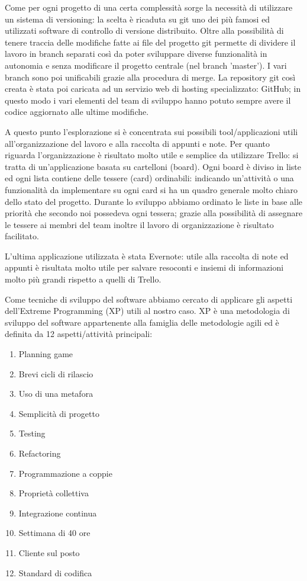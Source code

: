 \documentclass[12pt]{report}
\begin{document}
Come per ogni progetto di una certa complessità sorge la necessità di utilizzare un sistema di versioning: la scelta è ricaduta su git uno dei più famosi ed utilizzati software di controllo di versione distribuito. Oltre alla possibilità di tenere traccia delle modifiche fatte ai file del progetto git permette di dividere il lavoro in branch separati così da poter sviluppare diverse funzionalità in autonomia e senza modificare il progetto centrale (nel branch 'master'). I vari branch sono poi unificabili grazie alla procedura di merge. La repository git così creata è stata poi caricata ad un servizio web di hosting specializzato: GitHub; in questo modo i vari elementi del team di sviluppo hanno potuto sempre avere il codice aggiornato alle ultime modifiche.

A questo punto l'esplorazione si è concentrata sui possibili tool/applicazioni utili all'organizzazione del lavoro e alla raccolta di appunti e note.
Per quanto riguarda l'organizzazione è risultato molto utile e semplice da utilizzare Trello: si tratta di un'applicazione basata su cartelloni (board). Ogni board è diviso in liste ed ogni lista contiene delle tessere (card) ordinabili: indicando un'attività o una funzionalità da implementare su ogni card si ha un quadro generale molto chiaro dello stato del progetto. Durante lo sviluppo abbiamo ordinato le liste in base alle priorità che secondo noi possedeva ogni tessera; grazie alla possibilità di assegnare le tessere ai membri del team inoltre il lavoro di organizzazione è risultato facilitato.

L'ultima applicazione utilizzata è stata Evernote: utile alla raccolta di note ed appunti è risultata molto utile per salvare resoconti e insiemi di informazioni molto più grandi rispetto a quelli di Trello. 

Come tecniche di sviluppo del software abbiamo cercato di applicare gli aspetti dell'Extreme Programming (XP) utili al nostro caso. XP è una metodologia di sviluppo del software appartenente alla famiglia delle metodologie agili ed è definita da 12 aspetti/attività principali:
\begin{enumerate}
\item Planning game
\item Brevi cicli di rilascio
\item Uso di una metafora
\item Semplicità di progetto
\item Testing
\item Refactoring
\item Programmazione a coppie 
\item Proprietà collettiva 
\item Integrazione continua
\item Settimana di 40 ore
\item Cliente sul posto
\item Standard di codifica
\end{enumerate}
\end{document}
